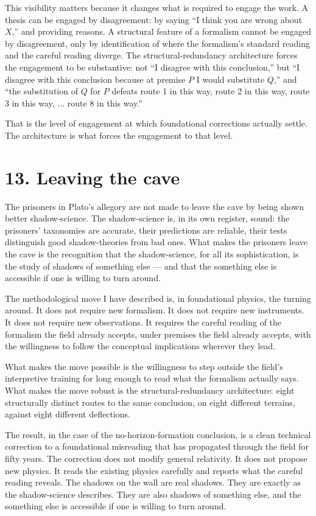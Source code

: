 \documentclass[11pt,a4paper]{article}
\begin{document}
This visibility matters because it changes what is required to engage the work. A thesis can be engaged by disagreement: by saying ``I think you are wrong about $X$,'' and providing reasons. A structural feature of a formalism cannot be engaged by disagreement, only by identification of where the formalism's standard reading and the careful reading diverge. The structural-redundancy architecture forces the engagement to be substantive: not ``I disagree with this conclusion,'' but ``I disagree with this conclusion because at premise $P$ I would substitute $Q$,'' and ``the substitution of $Q$ for $P$ defeats route 1 in this way, route 2 in this way, route 3 in this way, $\ldots$ route 8 in this way.''

That is the level of engagement at which foundational corrections actually settle. The architecture is what forces the engagement to that level.

\section*{13. Leaving the cave}

The prisoners in Plato's allegory are not made to leave the cave by being shown better shadow-science. The shadow-science is, in its own register, sound: the prisoners' taxonomies are accurate, their predictions are reliable, their tests distinguish good shadow-theories from bad ones. What makes the prisoners leave the cave is the recognition that the shadow-science, for all its sophistication, is the study of shadows of something else --- and that the something else is accessible if one is willing to turn around.

The methodological move I have described is, in foundational physics, the turning around. It does not require new formalism. It does not require new instruments. It does not require new observations. It requires the careful reading of the formalism the field already accepts, under premises the field already accepts, with the willingness to follow the conceptual implications wherever they lead.

What makes the move possible is the willingness to step outside the field's interpretive training for long enough to read what the formalism actually says. What makes the move robust is the structural-redundancy architecture: eight structurally distinct routes to the same conclusion, on eight different terrains, against eight different deflections.

The result, in the case of the no-horizon-formation conclusion, is a clean technical correction to a foundational misreading that has propagated through the field for fifty years. The correction does not modify general relativity. It does not propose new physics. It reads the existing physics carefully and reports what the careful reading reveals. The shadows on the wall are real shadows. They are exactly as the shadow-science describes. They are also shadows of something else, and the something else is accessible if one is willing to turn around.
\end{document}
